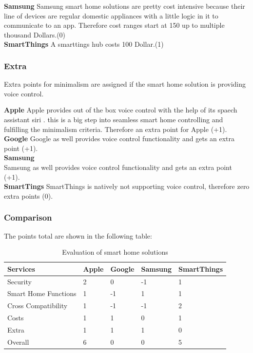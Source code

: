 			\textbf{Samsung}
				Samsung smart home solutions are pretty cost intensive because their line of devices are regular domestic appliances with a little logic in it to communicate to an app. Therefore cost ranges start at 150 up to multiple thousand Dollars.(0)\\

			\textbf{SmartThings}
				A smarttings hub costs 100 Dollar.(1)
			

		\subsubsection{Extra}
			Extra points for minimalism are assigned if the smart home solution is providing voice control.

			\textbf{Apple}
				Apple provides out of the box voice control with the help of its spaech assistant siri \parencite{IntroToHomeKit}. this is a big step into seamless smart home controlling and fulfilling the minimalism criteria. Therefore an extra point for Apple (+1).\\

			\textbf{Google}
				Google as well provides voice control functionality and gets an extra point (+1).\\

			\textbf{Samsung}\\
				Samsung as well provides voice control functionality and gets an extra point (+1).\\

			\textbf{SmartTings}
				SmartThings is natively not supporting voice control, therefore zero extra points (0).\\

			\pagebreak

		\subsubsection{Comparison}

			The points total are shown in the following table:

			\begin{table}[h]
				\centering
				\caption{Evaluation of smart home solutions}
				\label{Homekit_Accessory_Profile}
				\begin{tabular}{lllll}
					\textbf{Services}		& \textbf{Apple} 	& \textbf{Google}	& \textbf{Samsung}	& \textbf{SmartThings}	\\
					\hline
					Security				& 2					& 0 				& -1				& 1 \\
					Smart Home Functions	& 1					& -1 				& 1 				& 1	\\
					Cross Compatibility		& 1					& -1 				& -1				& 2	\\
					Costs					& 1					& 1					& 0					& 1 \\
					Extra					& 1 				& 1					& 1					& 0 \\
					\hline
					Overall					& 6					& 0					& 0 				& 5 \\
				\end{tabular}
			\end{table}


